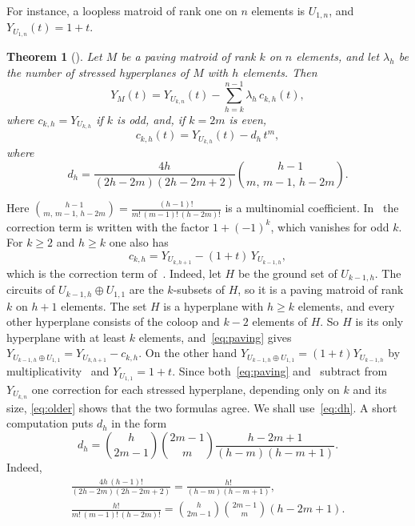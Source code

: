 \documentclass[11pt]{amsart}
\newtheorem{theorem}{Theorem}[section]
\theoremstyle{definition}
\theoremstyle{remark}
\numberwithin{equation}{section}
\begin{document}
For instance, a loopless matroid of rank one on $n$ elements is $U_{1,n}$, and $Y_{U_{1,n}}(t)=1+t$.

\begin{theorem}[{\cite[Theorem~1.7]{GLX}}]\label{thm:paving}
Let $M$ be a paving matroid of rank $k$ on $n$ elements, and let $\lambda_h$ be the number of stressed hyperplanes of $M$ with $h$ elements. Then
\begin{equation}\label{eq:paving}
Y_M(t)=Y_{U_{k,n}}(t)-\sum_{h=k}^{n-1}\lambda_h\,c_{k,h}(t),
\end{equation}
where $c_{k,h}=Y_{U_{k,h}}$ if $k$ is odd, and, if $k=2m$ is even,
\begin{equation}\label{eq:dh}
c_{k,h}(t)=Y_{U_{k,h}}(t)-d_h\,t^{m},
\end{equation}
where
\[
d_h=\frac{4h}{(2h-2m)(2h-2m+2)}\binom{h-1}{m,\,m-1,\,h-2m}.
\]
\end{theorem}

Here $\binom{h-1}{m,\,m-1,\,h-2m}=\frac{(h-1)!}{m!\,(m-1)!\,(h-2m)!}$ is a multinomial coefficient. In~\cite{GLX} the correction term is written with the factor $1+(-1)^k$, which vanishes for odd $k$. For $k\ge2$ and $h\ge k$ one also has
\begin{equation}\label{eq:older}
c_{k,h}=Y_{U_{k,h+1}}-(1+t)\,Y_{U_{k-1,h}},
\end{equation}
which is the correction term of~\cite[Proposition~5.3]{GRX}. Indeed, let $H$ be the ground set of $U_{k-1,h}$. The circuits of $U_{k-1,h}\oplus U_{1,1}$ are the $k$-subsets of $H$, so it is a paving matroid of rank $k$ on $h+1$ elements. The set $H$ is a hyperplane with $h\ge k$ elements, and every other hyperplane consists of the coloop and $k-2$ elements of $H$. So $H$ is its only hyperplane with at least $k$ elements, and~\eqref{eq:paving} gives $Y_{U_{k-1,h}\oplus U_{1,1}}=Y_{U_{k,h+1}}-c_{k,h}$. On the other hand $Y_{U_{k-1,h}\oplus U_{1,1}}=(1+t)Y_{U_{k-1,h}}$ by multiplicativity~\cite[Proposition~2.3]{GRX} and $Y_{U_{1,1}}=1+t$. Since both~\eqref{eq:paving} and~\cite[Proposition~5.3]{GRX} subtract from $Y_{U_{k,n}}$ one correction for each stressed hyperplane, depending only on $k$ and its size, \eqref{eq:older} shows that the two formulas agree. We shall use~\eqref{eq:dh}. A short computation puts $d_h$ in the form
\begin{equation}\label{eq:dh-simplified}
d_h=\binom{h}{2m-1}\binom{2m-1}{m}\frac{h-2m+1}{(h-m)(h-m+1)}.
\end{equation}
Indeed,
\begin{gather*}
\frac{4h\,(h-1)!}{(2h-2m)(2h-2m+2)}=\frac{h!}{(h-m)(h-m+1)},\\
\frac{h!}{m!\,(m-1)!\,(h-2m)!}=\binom{h}{2m-1}\binom{2m-1}{m}(h-2m+1).
\end{gather*}
\end{document}
